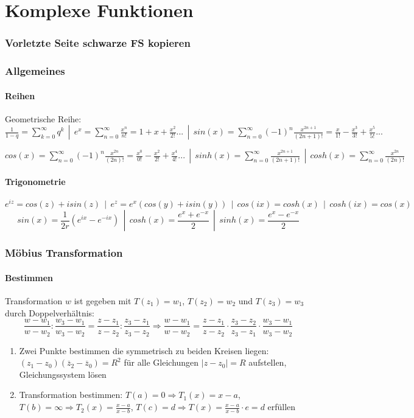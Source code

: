\documentclass[10pt,a4paper]{article}
\begin{document}
\part*{Komplexe Funktionen}

\section{Vorletzte Seite schwarze FS kopieren}

\section{Allgemeines}
\subsection{Reihen}
Geometrische Reihe: $\frac{1}{1-q} = \sum\limits_{k=0}^\infty q^k\ \  |\ \  e^x = \sum\limits_{n=0}^\infty \frac{x^n}{n!} = 1+x+\frac{x^2}{2!} ... \ \ |\ \ sin(x)=\sum\limits_{n=0}^\infty (-1)^n \frac{x^{2n+1}}{(2n+1)!} = \frac{x}{1!} - \frac{x^3}{3!} + \frac{x^5}{5!}...$

$cos(x)=\sum\limits_{n=0}^\infty (-1)^n \frac{x^{2n}}{(2n)!} = \frac{x^0}{0!} - \frac{x^2}{2!} + \frac{x^4}{4!}...
 \ \ |\ \ sinh(x)=\sum\limits_{n=0}^\infty \frac{x^{2n+1}}{(2n+1)!}
  \ \ |\ \ cosh(x)=\sum\limits_{n=0}^\infty \frac{x^{2n}}{(2n)!}$

\subsection{Trigonometrie}
\[e^{iz} = cos(z)+i sin(z)
\ \ |\ \ e^z = e^x(cos(y)+i sin(y))
\ \ |\ \ cos(ix)=cosh(x)
\ \ |\ \ cosh(ix)=cos(x)\]
\[sin(x)=\frac{1}{2r}\left(e^{ix} - e^{-ix} \right)
\ \ |\ \ cosh(x)=\frac{e^x + e^{-x}}{2}
\ \ |\ \ sinh(x)=\frac{e^x - e^{-x}}{2}
\]

\section{Möbius Transformation}
\subsection{Bestimmen}
Transformation $w$ ist gegeben mit $T(z_1)=w_1$, $T(z_2)=w_2$ und $T(z_3)=w_3$ durch Doppelverhältnis:
\[
\frac{w-w_1}{w-w_2} : \frac{w_3-w_1}{w_3-w_2} = \frac{z-z_1}{z-z_2} : \frac{z_3-z_1}{z_3-z_2}
\Rightarrow
\frac{w-w_1}{w-w_2} = \frac{z-z_1}{z-z_2} \cdot \frac{z_3-z_2}{z_3-z_1}  \cdot \frac{w_3-w_1}{w_3-w_2}
\]
\begin{enumerate}
\item Zwei Punkte bestimmen die symmetrisch zu beiden Kreisen liegen: $(z_1 - z_0)(\overline{z}_2 - \overline{z}_0) = R^2$ für alle Gleichungen $|z - z_0| = R$ aufstellen, Gleichungssystem lösen
\item Transformation bestimmen: $T(a) = 0 \Rightarrow T_1(x) = x - a$, $T(b) = \infty \Rightarrow T_2(x) = \frac{x-a}{x-b}$, $T(c) = d \Rightarrow T(x) = \frac{x-a}{x-b} \cdot e = d$ erfüllen
\end{enumerate}
\end{document}
